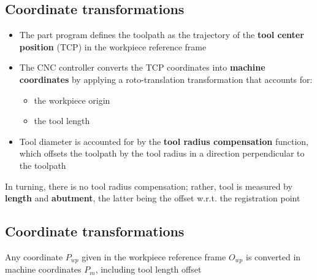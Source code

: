 \documentclass[
  letterpaper,
  DIV=11,
  numbers=noendperiod]{scrartcl}
\providecommand{\tightlist}{%
  \setlength{\itemsep}{0pt}\setlength{\parskip}{0pt}}
\begin{document}
\subsection{Coordinate
transformations}\label{coordinate-transformations}

\begin{itemize}
\tightlist
\item
  The part program defines the toolpath as the trajectory of the
  \textbf{tool center position} (TCP) in the workpiece reference frame
\item
  The CNC controller converts the TCP coordinates into \textbf{machine
  coordinates} by applying a roto-translation transformation that
  accounts for:

  \begin{itemize}
  \tightlist
  \item
    the workpiece origin
  \item
    the tool length
  \end{itemize}
\item
  Tool diameter is accounted for by the \textbf{tool radius
  compensation} function, which offsets the toolpath by the tool radius
  in a direction perpendicular to the toolpath
\end{itemize}

\begin{tcolorbox}[enhanced jigsaw, arc=.35mm, bottomrule=.15mm, bottomtitle=1mm, breakable, colback=white, colbacktitle=quarto-callout-note-color!10!white, colframe=quarto-callout-note-color-frame, coltitle=black, left=2mm, leftrule=.75mm, opacityback=0, opacitybacktitle=0.6, rightrule=.15mm, title=\textcolor{quarto-callout-note-color}{\faInfo}\hspace{0.5em}{Note}, titlerule=0mm, toprule=.15mm, toptitle=1mm]

In turning, there is no tool radius compensation; rather, tool is
measured by \textbf{length} and \textbf{abutment}, the latter being the
offset w.r.t. the registration point

\end{tcolorbox}

\subsection{Coordinate
transformations}\label{coordinate-transformations-1}

Any coordinate \(P_{wp}\) given in the workpiece reference frame
\(O_{wp}\) is converted in machine coordinates \(P_m\), including tool
length offset
\end{document}
